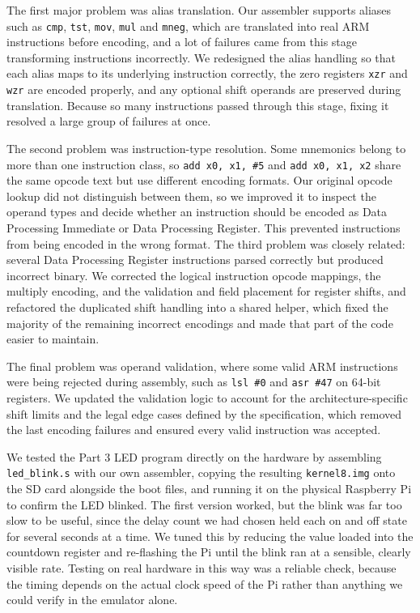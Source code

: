\documentclass[11pt]{article}
\newcommand{\code}[1]{\texttt{#1}}
\begin{document}
The first major problem was alias translation. Our assembler supports aliases such as \code{cmp}, \code{tst}, \code{mov}, \code{mul} and \code{mneg}, which are translated into real ARM instructions before encoding, and a lot of failures came from this stage transforming instructions incorrectly. We redesigned the alias handling so that each alias maps to its underlying instruction correctly, the zero registers \code{xzr} and \code{wzr} are encoded properly, and any optional shift operands are preserved during translation. Because so many instructions passed through this stage, fixing it resolved a large group of failures at once.

The second problem was instruction-type resolution. Some mnemonics belong to more than one instruction class, so \code{add x0, x1, \#5} and \code{add x0, x1, x2} share the same opcode text but use different encoding formats. Our original opcode lookup did not distinguish between them, so we improved it to inspect the operand types and decide whether an instruction should be encoded as Data Processing Immediate or Data Processing Register. This prevented instructions from being encoded in the wrong format. The third problem was closely related: several Data Processing Register instructions parsed correctly but produced incorrect binary. We corrected the logical instruction opcode mappings, the multiply encoding, and the validation and field placement for register shifts, and refactored the duplicated shift handling into a shared helper, which fixed the majority of the remaining incorrect encodings and made that part of the code easier to maintain.

The final problem was operand validation, where some valid ARM instructions were being rejected during assembly, such as \code{lsl \#0} and \code{asr \#47} on 64-bit registers. We updated the validation logic to account for the architecture-specific shift limits and the legal edge cases defined by the specification, which removed the last encoding failures and ensured every valid instruction was accepted.

We tested the Part 3 LED program directly on the hardware by assembling \code{led\_blink.s} with our own assembler, copying the resulting \code{kernel8.img} onto the SD card alongside the boot files, and running it on the physical Raspberry Pi to confirm the LED blinked. The first version worked, but the blink was far too slow to be useful, since the delay count we had chosen held each on and off state for several seconds at a time. We tuned this by reducing the value loaded into the countdown register and re-flashing the Pi until the blink ran at a sensible, clearly visible rate. Testing on real hardware in this way was a reliable check, because the timing depends on the actual clock speed of the Pi rather than anything we could verify in the emulator alone.
\end{document}
